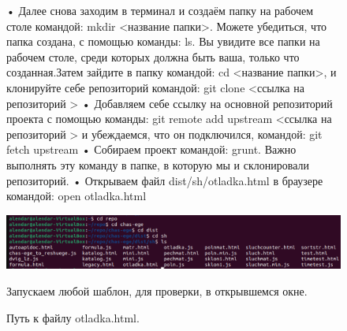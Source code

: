 \documentclass[oneside,final,12pt]{extarticle} %
\begin{document}
\begin{figure}
• Далее снова заходим в терминал и создаём папку на рабочем столе командой: mkdir <название папки>. Можете убедиться, что папка создана, с помощью команды: ls. Вы увидите все папки на рабочем столе, среди которых должна быть ваша, только что созданная.Затем зайдите в папку командой: cd <название папки>, и клонируйте себе репозиторий командой: git clone <ссылка на репозиторий >
  \newline   • Добавляем себе ссылку на основной репозиторий проекта с помощью команды: git remote add upstream <ссылка на репозиторий > и убеждаемся, что он подключился, командой: git fetch upstream 
   \newline  • Собираем проект командой: grunt. Важно выполнять эту команду в папке, в которую мы и склонировали репозиторий.
  \newline  • Открываем файл dist/sh/otladka.html в браузере командой: open otladka.html


		\includegraphics[width=1\linewidth]{img/7.png}
\caption{Путь к файлу otladka.html.}
\label{ris:image}
\quad Запускаем любой шаблон, для проверки, в открывшемся окне.
\end{figure}
\end{document}
